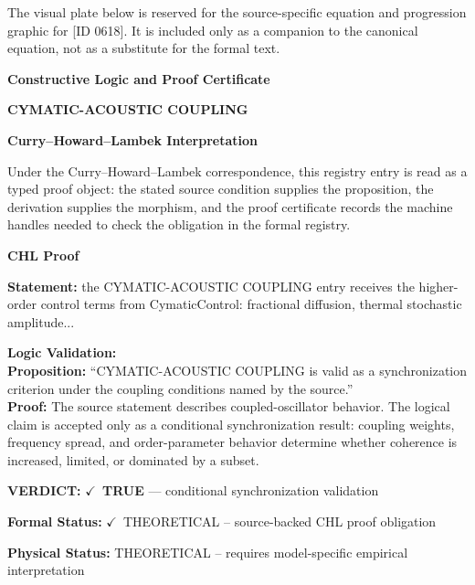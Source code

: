 \begingroup\footnotesize\sloppy
The visual plate below is reserved for the source-specific equation and progression graphic for [ID 0618]. It is included only as a companion to the canonical equation, not as a substitute for the formal text.
\par\endgroup
\ifTZPDarkEdition
{}
\fi

\clearpage
\begingroup\tzpsupportsetup
\noindent\textbf{\fontsize{10.8pt}{12.8pt}\selectfont [ID 0618] Constructive Logic and Proof Certificate}\par
\noindent\textbf{\fontsize{10pt}{12pt}\selectfont CYMATIC-ACOUSTIC COUPLING}\par
\vspace{0.45em}
\begingroup
\footnotesize
\setlength{\parskip}{0.22em}
\setlength{\parindent}{0pt}
\noindent\textbf{Curry--Howard--Lambek Interpretation}\par
Under the Curry--Howard--Lambek correspondence, this registry entry is read as a typed proof
object: the stated source condition supplies the proposition, the derivation supplies the
morphism, and the proof certificate records the machine handles needed to check the obligation
in the formal registry.

\vspace{0.45em}
\noindent\textbf{CHL Proof}\par
\textbf{Statement:} the CYMATIC-ACOUSTIC COUPLING entry receives the higher-order control terms from
CymaticControl: fractional diffusion, thermal stochastic amplitude...

\textbf{Logic Validation:}\\
\textbf{Proposition:} ``CYMATIC-ACOUSTIC COUPLING is valid as a synchronization criterion under the coupling
conditions named by the source.''\\
\textbf{Proof:} The source statement describes coupled-oscillator behavior. The logical claim is
accepted only as a conditional synchronization result: coupling weights, frequency
spread, and order-parameter behavior determine whether coherence is increased, limited,
or dominated by a subset.

\textbf{VERDICT:} \ensuremath{\checkmark}\ \textbf{TRUE} --- conditional synchronization validation

\textbf{Formal Status:} \ensuremath{\checkmark}\ THEORETICAL -- source-backed CHL proof obligation

\textbf{Physical Status:} THEORETICAL -- requires model-specific empirical interpretation
\par\vspace{0.45em}
\par
\ifTZPDarkEdition
{}
\fi
\endgroup
\endgroup
